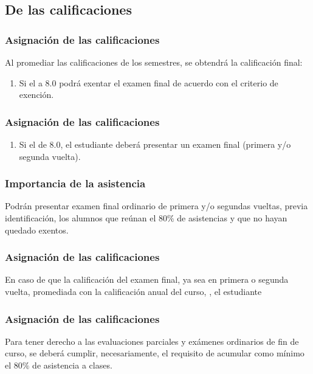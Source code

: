 \documentclass[14pt]{beamer}
\begin{document}
\subsection{De las calificaciones}

\begin{frame}
\frametitle{Asignación de las calificaciones}
Al promediar las calificaciones de los semestres, se obtendrá la calificación final:
\begin{enumerate}[<+->]
\item Si el  a $8.0$ podrá exentar el examen final de acuerdo con el criterio de exención.
\seti
\end{enumerate}
\end{frame}
\begin{frame}
\frametitle{Asignación de las calificaciones}
\begin{enumerate}[<+->]
\conti
\item Si el  de 8.0, el estudiante deberá presentar un examen final (primera y/o segunda vuelta).
\end{enumerate}
\end{frame}
\begin{frame}
\frametitle{Importancia de la asistencia}
Podrán presentar examen final ordinario de primera y/o segundas vueltas, previa identificación, los alumnos que reúnan el $80\%$ de asistencias y que no hayan quedado exentos.
\end{frame}
\begin{frame}
\frametitle{Asignación de las calificaciones}    
En caso de que la calificación del examen final, ya sea en primera o segunda vuelta, promediada con la calificación anual del curso, , \pause el estudiante 
\end{frame}
\begin{frame}
\frametitle{Asignación de las calificaciones}
Para tener derecho a las evaluaciones parciales y exámenes ordinarios de fin de curso, se deberá cumplir, necesariamente, el requisito de acumular como mínimo el $80\%$ de asistencia a clases.
\end{frame}
\end{document}
